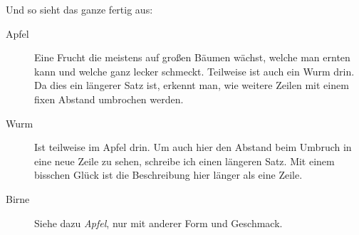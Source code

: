 Und so sieht das ganze fertig aus:

\begin{description}
	\item[Apfel] Eine Frucht die meistens auf großen Bäumen wächst,
		welche man ernten kann und welche ganz lecker schmeckt.
		Teilweise ist auch ein Wurm drin. Da dies ein längerer Satz ist,
		erkennt man, wie weitere Zeilen mit einem fixen Abstand 
		umbrochen werden.
	\item[Wurm] Ist teilweise im Apfel drin.
		Um auch hier den Abstand beim Umbruch in eine neue Zeile zu sehen,
		schreibe ich einen längeren Satz. Mit einem bisschen Glück ist die
		Beschreibung hier länger als eine Zeile.
	\item[Birne] Siehe dazu \emph{Apfel}, nur mit anderer Form und Geschmack.
\end{description}

